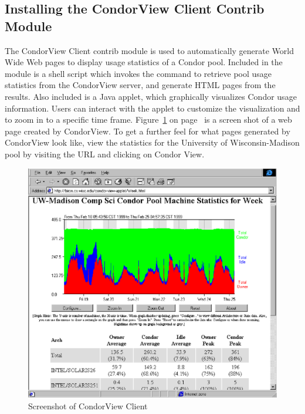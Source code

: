 \subsection{\label{sec:CondorView-Client-Install}
Installing the CondorView Client Contrib Module} 

The CondorView Client contrib module is used to automatically generate
World Wide Web pages to display usage statistics of a Condor
pool.
Included in the module is a shell script which invokes the 
command to retrieve pool usage statistics from the CondorView server, and
generate HTML pages from the results.  
Also included is a Java applet, which graphically visualizes Condor 
usage information.  
Users can interact with the applet to customize the visualization and to
zoom in to a specific time frame.
Figure~\ref{fig:view-screenshot} on page~\pageref{fig:view-screenshot}
is a screen shot of a web page created by CondorView.  
To get a further feel for what pages generated by CondorView look like,
view the statistics for the University of Wisconsin-Madison pool
by visiting the URL  and clicking on
Condor View.

\begin{figure}[hbt]
\centering
\includegraphics{admin-man/view-screenshot.ps}
\caption{\label{fig:view-screenshot}Screenshot of CondorView Client}
\end{figure}

